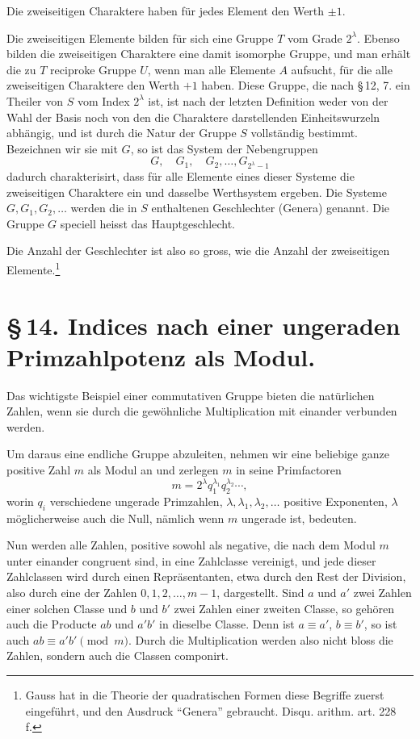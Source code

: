 \documentclass[11pt]{article}
\begin{document}
Die zweiseitigen Charaktere haben für jedes Element den Werth $\pm1$.

Die zweiseitigen Elemente bilden für sich eine Gruppe $T$ vom Grade $2^\lambda$. Ebenso bilden die zweiseitigen Charaktere eine damit isomorphe Gruppe, und man erhält die zu $T$ reciproke Gruppe $U$, wenn man alle Elemente $A$ aufsucht, für die alle zweiseitigen Charaktere den Werth $+1$ haben. Diese Gruppe, die nach \S\,12, 7. ein Theiler von $S$ vom Index $2^\lambda$ ist, ist nach der letzten Definition weder von der Wahl der Basis noch von den die Charaktere darstellenden Einheitswurzeln abhängig, und ist durch die Natur der Gruppe $S$ vollständig bestimmt. Bezeichnen wir sie mit $G$, so ist das System der Nebengruppen
\begin{equation}
G,
\quad G_1,
\quad G_2,
\ldots,
G_{2^\lambda-1}
\tag{3}
\end{equation}
dadurch charakterisirt, dass für alle Elemente eines dieser Systeme die zweiseitigen Charaktere ein und dasselbe Werthsystem ergeben. Die Systeme $G,G_1,G_2,
\ldots$ werden die in $S$ enthaltenen Geschlechter (Genera) genannt. Die Gruppe $G$ speciell heisst das Hauptgeschlecht.

Die Anzahl der Geschlechter ist also so gross, wie die Anzahl der zweiseitigen Elemente.\footnote{Gauss hat in die Theorie der quadratischen Formen diese Begriffe zuerst eingeführt, und den Ausdruck ``Genera'' gebraucht. Disqu. arithm. art. 228 f.}

\section*{\S\,14. Indices nach einer ungeraden Primzahlpotenz als Modul.}

Das wichtigste Beispiel einer commutativen Gruppe bieten die natürlichen Zahlen, wenn sie durch die gewöhnliche Multiplication mit einander verbunden werden.

Um daraus eine endliche Gruppe abzuleiten, nehmen wir eine beliebige ganze positive Zahl $m$ als Modul an und zerlegen $m$ in seine Primfactoren
\begin{equation}
m=2^\lambda q_1^{\lambda_1}q_2^{\lambda_2}\cdots,
\tag{1}
\end{equation}
worin $q_i$ verschiedene ungerade Primzahlen, $\lambda,\lambda_1,\lambda_2,
\ldots$ positive Exponenten, $\lambda$ möglicherweise auch die Null, nämlich wenn $m$ ungerade ist, bedeuten.

Nun werden alle Zahlen, positive sowohl als negative, die nach dem Modul $m$ unter einander congruent sind, in eine Zahlclasse vereinigt, und jede dieser Zahlclassen wird durch einen Repräsentanten, etwa durch den Rest der Division, also durch eine der Zahlen $0,1,2,\ldots,m-1$, dargestellt. Sind $a$ und $a'$ zwei Zahlen einer solchen Classe und $b$ und $b'$ zwei Zahlen einer zweiten Classe, so gehören auch die Producte $ab$ und $a'b'$ in dieselbe Classe. Denn ist $a\equiv a'$, $b\equiv b'$, so ist auch $ab\equiv a'b'\pmod m$. Durch die Multiplication werden also nicht bloss die Zahlen, sondern auch die Classen componirt.
\end{document}
